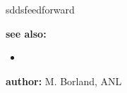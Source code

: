 \begin{sddsprog}{sddsfeedforward}
\item \textbf{see also:}
\begin{itemize}
  \item {}
\end{itemize}
\item \textbf{author:} M. Borland, ANL
\end{sddsprog}
